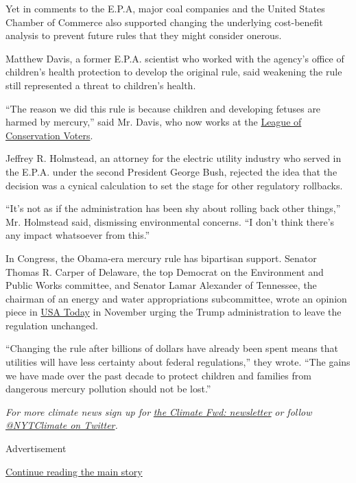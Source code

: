 Yet in comments to the E.P.A, major coal companies and the United States
Chamber of Commerce also supported changing the underlying cost-benefit
analysis to prevent future rules that they might consider onerous.

Matthew Davis, a former E.P.A. scientist who worked with the agency's
office of children's health protection to develop the original rule,
said weakening the rule still represented a threat to children's health.

``The reason we did this rule is because children and developing fetuses
are harmed by mercury,'' said Mr. Davis, who now works at the
\href{https://www.lcv.org/}{League of Conservation Voters}.

Jeffrey R. Holmstead, an attorney for the electric utility industry who
served in the E.P.A. under the second President George Bush, rejected
the idea that the decision was a cynical calculation to set the stage
for other regulatory rollbacks.

``It's not as if the administration has been shy about rolling back
other things,'' Mr. Holmstead said, dismissing environmental concerns.
``I don't think there's any impact whatsoever from this.''

In Congress, the Obama-era mercury rule has bipartisan support. Senator
Thomas R. Carper of Delaware, the top Democrat on the Environment and
Public Works committee, and Senator Lamar Alexander of Tennessee, the
chairman of an energy and water appropriations subcommittee, wrote an
opinion piece in
\href{https://www.usatoday.com/story/opinion/2019/11/12/trump-epa-keep-mercury-pollution-rule-keep-america-healthy-column/4156901002/}{USA
Today} in November urging the Trump administration to leave the
regulation unchanged.

``Changing the rule after billions of dollars have already been spent
means that utilities will have less certainty about federal
regulations,'' they wrote. ``The gains we have made over the past decade
to protect children and families from dangerous mercury pollution should
not be lost.''

\emph{For more climate news sign up for}
\href{https://www.nytimes3xbfgragh.onion/newsletters/climate-change}{\emph{the
Climate Fwd: newsletter}} \emph{or follow}
\href{https://twitter.com/nytclimate}{\emph{@NYTClimate on
Twitter}}\emph{.}

Advertisement

\protect\hyperlink{after-bottom}{Continue reading the main story}

